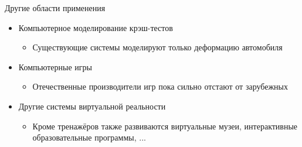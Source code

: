 \documentclass[usenames,dvipsnames,pdftex,unicode,hidelinks]{beamer}
\begin{document}
  \begin{frame}{Другие области применения}
    \begin{itemize}
      \setlength{\itemsep}{5mm}
      \item Компьютерное моделирование крэш-тестов
        \begin{itemize}
          \item Существующие системы моделируют только деформацию автомобиля
        \end{itemize}

      \item Компьютерные игры
        \begin{itemize}
          \item Отечественные производители игр пока сильно отстают от зарубежных
        \end{itemize}

      \item Другие системы виртуальной реальности
        \begin{itemize}
          \item Кроме тренажёров также развиваются виртуальные музеи, интерактивные образовательные
            программы, ...
        \end{itemize}
    \end{itemize}
  \end{frame}
\end{document}
